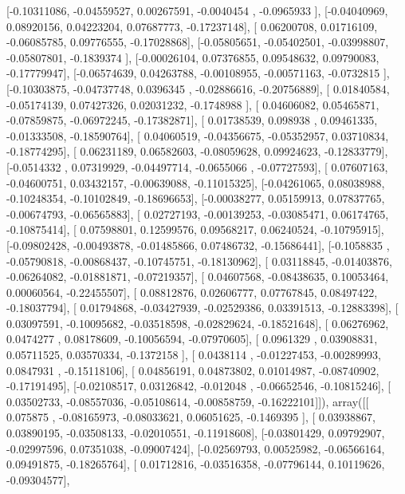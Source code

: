 \documentclass{article}
\begin{document}
       [-0.10311086, -0.04559527,  0.00267591, -0.0040454 , -0.0965933 ],
       [-0.04040969,  0.08920156,  0.04223204,  0.07687773, -0.17237148],
       [ 0.06200708,  0.01716109, -0.06085785,  0.09776555, -0.17028868],
       [-0.05805651, -0.05402501, -0.03998807, -0.05807801, -0.1839374 ],
       [-0.00026104,  0.07376855,  0.09548632,  0.09790083, -0.17779947],
       [-0.06574639,  0.04263788, -0.00108955, -0.00571163, -0.0732815 ],
       [-0.10303875, -0.04737748,  0.0396345 , -0.02886616, -0.20756889],
       [ 0.01840584, -0.05174139,  0.07427326,  0.02031232, -0.1748988 ],
       [ 0.04606082,  0.05465871, -0.07859875, -0.06972245, -0.17382871],
       [ 0.01738539,  0.098938  ,  0.09461335, -0.01333508, -0.18590764],
       [ 0.04060519, -0.04356675, -0.05352957,  0.03710834, -0.18774295],
       [ 0.06231189,  0.06582603, -0.08059628,  0.09924623, -0.12833779],
       [-0.0514332 ,  0.07319929, -0.04497714, -0.0655066 , -0.07727593],
       [ 0.07607163, -0.04600751,  0.03432157, -0.00639088, -0.11015325],
       [-0.04261065,  0.08038988, -0.10248354, -0.10102849, -0.18696653],
       [-0.00038277,  0.05159913,  0.07837765, -0.00674793, -0.06565883],
       [ 0.02727193, -0.00139253, -0.03085471,  0.06174765, -0.10875414],
       [ 0.07598801,  0.12599576,  0.09568217,  0.06240524, -0.10795915],
       [-0.09802428, -0.00493878, -0.01485866,  0.07486732, -0.15686441],
       [-0.1058835 , -0.05790818, -0.00868437, -0.10745751, -0.18130962],
       [ 0.03118845, -0.01403876, -0.06264082, -0.01881871, -0.07219357],
       [ 0.04607568, -0.08438635,  0.10053464,  0.00060564, -0.22455507],
       [ 0.08812876,  0.02606777,  0.07767845,  0.08497422, -0.18037794],
       [ 0.01794868, -0.03427939, -0.02529386,  0.03391513, -0.12883398],
       [ 0.03097591, -0.10095682, -0.03518598, -0.02829624, -0.18521648],
       [ 0.06276962,  0.0474277 ,  0.08178609, -0.10056594, -0.07970605],
       [ 0.0961329 ,  0.03908831,  0.05711525,  0.03570334, -0.1372158 ],
       [ 0.0438114 , -0.01227453, -0.00289993,  0.0847931 , -0.15118106],
       [ 0.04856191,  0.04873802,  0.01014987, -0.08740902, -0.17191495],
       [-0.02108517,  0.03126842, -0.012048  , -0.06652546, -0.10815246],
       [ 0.03502733, -0.08557036, -0.05108614, -0.00858759, -0.16222101]]), array([[ 0.075875  , -0.08165973, -0.08033621,  0.06051625, -0.1469395 ],
       [ 0.03938867,  0.03890195, -0.03508133, -0.02010551, -0.11918608],
       [-0.03801429,  0.09792907, -0.02997596,  0.07351038, -0.09007424],
       [-0.02569793,  0.00525982, -0.06566164,  0.09491875, -0.18265764],
       [ 0.01712816, -0.03516358, -0.07796144,  0.10119626, -0.09304577],
\end{document}
